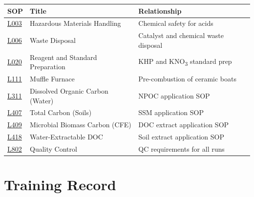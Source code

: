\documentclass[
  11pt,
  letterpaper,
]{article}
\newcounter{none} %
\begin{document}
{\def\LTcaptype{none} %
\begin{longtable}[]{@{}
  >{\raggedright\arraybackslash}p{}
  >{\raggedright\arraybackslash}p{}
  >{\raggedright\arraybackslash}p{}@{}}
\toprule\noalign{}
\begin{minipage}[b]{\linewidth}\raggedright
SOP
\end{minipage} & \begin{minipage}[b]{\linewidth}\raggedright
Title
\end{minipage} & \begin{minipage}[b]{\linewidth}\raggedright
Relationship
\end{minipage} \\
\midrule\noalign{}
\endhead
\bottomrule\noalign{}
\endlastfoot
\href{SOP-L003-hazardous-materials-handling.qmd}{L003} & Hazardous
Materials Handling & Chemical safety for acids \\
\href{SOP-L006-waste-disposal.qmd}{L006} & Waste Disposal & Catalyst and
chemical waste disposal \\
\href{SOP-L020-reagent-standard-preparation.qmd}{L020} & Reagent and
Standard Preparation & KHP and KNO\textsubscript{3} standard prep \\
\href{SOP-L111-muffle-furnace.qmd}{L111} & Muffle Furnace &
Pre-combustion of ceramic boats \\
\href{SOP-L311-dissolved-organic-carbon-water.qmd}{L311} & Dissolved
Organic Carbon (Water) & NPOC application SOP \\
\href{SOP-L407-total-carbon.qmd}{L407} & Total Carbon (Soils) & SSM
application SOP \\
\href{SOP-L409-microbial-biomass-carbon.qmd}{L409} & Microbial Biomass
Carbon (CFE) & DOC extract application SOP \\
\href{SOP-L418-water-extractable-doc.qmd}{L418} & Water-Extractable DOC
& Soil extract application SOP \\
\href{SOP-L802-quality-control.qmd}{L802} & Quality Control & QC
requirements for all runs \\
\end{longtable}
}

\section{Training Record}\label{training-record}
\end{document}
